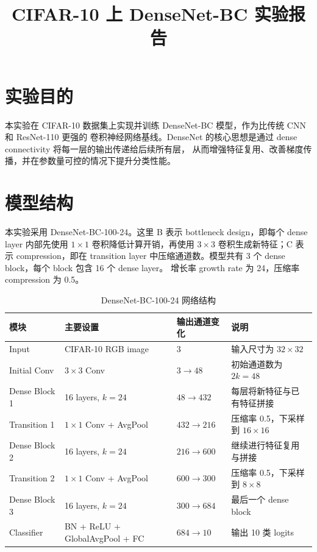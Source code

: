 \documentclass[UTF8]{ctexart}
\title{CIFAR-10 上 DenseNet-BC 实验报告}
\author{}
\date{}
\begin{document}
\maketitle

\section{实验目的}

本实验在 CIFAR-10 数据集上实现并训练 DenseNet-BC 模型，作为比传统 CNN 和 ResNet-110 更强的
卷积神经网络基线。DenseNet 的核心思想是通过 dense connectivity 将每一层的输出传递给后续所有层，
从而增强特征复用、改善梯度传播，并在参数量可控的情况下提升分类性能。

\section{模型结构}

本实验采用 DenseNet-BC-100-24。这里 B 表示 bottleneck design，即每个 dense layer 内部先使用
$1\times1$ 卷积降低计算开销，再使用 $3\times3$ 卷积生成新特征；C 表示 compression，即在
transition layer 中压缩通道数。模型共有 3 个 dense block，每个 block 包含 16 个 dense layer。
增长率 growth rate 为 24，压缩率 compression 为 0.5。

\begin{table}[H]
    \centering
    \caption{DenseNet-BC-100-24 网络结构}
    \begin{tabularx}{\textwidth}{lllY}
        \toprule
        模块 & 主要设置 & 输出通道变化 & 说明 \\
        \midrule
        Input & CIFAR-10 RGB image & 3 & 输入尺寸为 $32\times32$ \\
        Initial Conv & $3\times3$ Conv & $3\rightarrow48$ & 初始通道数为 $2k=48$ \\
        Dense Block 1 & 16 layers, $k=24$ & $48\rightarrow432$ & 每层将新特征与已有特征拼接 \\
        Transition 1 & $1\times1$ Conv + AvgPool & $432\rightarrow216$ & 压缩率 0.5，下采样到 $16\times16$ \\
        Dense Block 2 & 16 layers, $k=24$ & $216\rightarrow600$ & 继续进行特征复用与拼接 \\
        Transition 2 & $1\times1$ Conv + AvgPool & $600\rightarrow300$ & 压缩率 0.5，下采样到 $8\times8$ \\
        Dense Block 3 & 16 layers, $k=24$ & $300\rightarrow684$ & 最后一个 dense block \\
        Classifier & BN + ReLU + GlobalAvgPool + FC & $684\rightarrow10$ & 输出 10 类 logits \\
        \bottomrule
    \end{tabularx}
\end{table}
\end{document}
